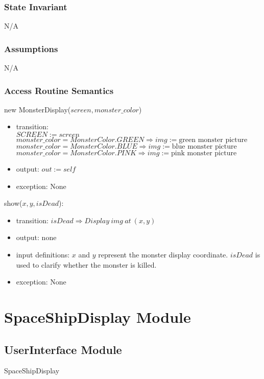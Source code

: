 \documentclass[12pt]{article}
\begin{document}
\subsubsection*{State Invariant}
N/A
\subsubsection*{Assumptions}
N/A
\subsubsection*{Access Routine Semantics}

new MonsterDisplay($screen, monster\_color$)
\begin{itemize}
    \item transition: \\$SCREEN := screen$
    \\$monster\_color = MonsterColor.GREEN \Rightarrow img := \text{green monster picture}$
    \\$monster\_color = MonsterColor.BLUE \Rightarrow img := \text{blue monster picture}$
    \\$monster\_color = MonsterColor.PINK \Rightarrow img := \text{pink monster picture}$
    \item output: $out := \mathit{self}$
    \item exception: None
\end{itemize}

\noindent show($x, y, isDead$):
\begin{itemize}
    \item transition:
    $isDead \Rightarrow Display\ img\ at\ (x, y)$
    \item output: none
    \item input definitions: $x$ and $y$ represent the monster display coordinate. $isDead$ is used to clarify whether the monster is killed.
    \item exception: None
\end{itemize}
\newpage

\section{SpaceShipDisplay Module}

\subsection*{UserInterface Module}
SpaceShipDisplay
\end{document}
